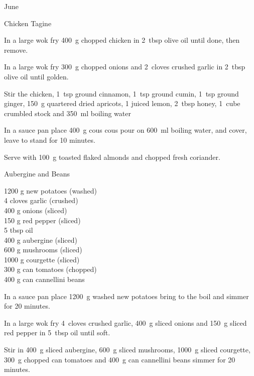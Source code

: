 \begin{menu}{June}
\begin{recipe}{2}{Chicken Tagine}
	
    \begin{instructions}
    \item 
        In a large wok fry
        400~g chopped chicken
        in
        2~tbsp  olive oil
        until done, then remove.
      \item 
        In a large wok fry
        300~g chopped onions
        and
        2~cloves crushed garlic
        in
        2~tbsp  olive oil
        until golden.
      \item 
        Stir the chicken,
        1~tsp  ground cinnamon,
        1~tsp  ground cumin,
        1~tsp  ground ginger,
        150~g quartered dried apricots,
        1 juiced lemon,
        2~tbsp  honey,
        1~cube crumbled stock
        and
        350~ml  boiling water\item 
    In a
    sauce pan 
    place
    400~g  cous cous
    pour on
    600~ml  boiling water,
    and cover, leave to stand for 10 minutes.
  \item 
        Serve with
        100~g toasted flaked almonds
        and
         chopped fresh coriander.
      
    \end{instructions}
    \end{recipe}%
  
    \begin{recipe}{2}{Aubergine and Beans}%
		\begin{ingredients}
		1200 g new potatoes (washed) \\
	4 cloves garlic (crushed) \\
	400 g onions (sliced) \\
	150 g red pepper (sliced) \\
	5 tbsp oil  \\
	400 g aubergine (sliced) \\
	600 g mushrooms (sliced) \\
	1000 g courgette (sliced) \\
	300 g can tomatoes (chopped) \\
	400 g can cannellini beans  \\
	
		\end{ingredients}
	
	
    \begin{instructions}
    \item 
    In a sauce pan place
    1200~g washed new potatoes
    bring to the boil and simmer for 20 minutes.
  \item 
        In a large wok fry
        4~cloves crushed garlic,
        400~g sliced onions
        and
        150~g sliced red pepper
        in
        5~tbsp  oil
        until soft.
      \item 
        Stir in
        400~g sliced aubergine,
        600~g sliced mushrooms,
        1000~g sliced courgette,
        300~g chopped can tomatoes
        and
        400~g  can cannellini beans
        simmer for 20 minutes.
      

\end{instructions}
\end{recipe}
\end{menu}
